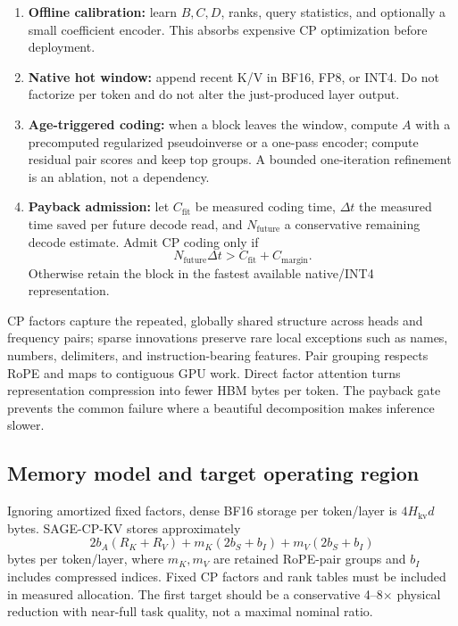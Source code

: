 \documentclass[10pt]{article}
\begin{document}
\begin{enumerate}[leftmargin=1.55em,itemsep=3pt]
\item \textbf{Offline calibration:} learn $B,C,D$, ranks, query statistics, and optionally a
small coefficient encoder. This absorbs expensive CP optimization before deployment.
\item \textbf{Native hot window:} append recent K/V in BF16, FP8, or INT4. Do not factorize per
token and do not alter the just-produced layer output.
\item \textbf{Age-triggered coding:} when a block leaves the window, compute $A$ with a
precomputed regularized pseudoinverse or a one-pass encoder; compute residual pair scores and keep
top groups. A bounded one-iteration refinement is an ablation, not a dependency.
\item \textbf{Payback admission:} let $C_{\mathrm{fit}}$ be measured coding time, $\Delta t$ the
measured time saved per future decode read, and $N_{\mathrm{future}}$ a conservative remaining
decode estimate. Admit CP coding only if
\[
N_{\mathrm{future}}\Delta t > C_{\mathrm{fit}}+C_{\mathrm{margin}}.
\]
Otherwise retain the block in the fastest available native/INT4 representation.
\end{enumerate}

\begin{keybox}[title={Intuitive advantage}]
CP factors capture the repeated, globally shared structure across heads and frequency pairs;
sparse innovations preserve rare local exceptions such as names, numbers, delimiters, and
instruction-bearing features. Pair grouping respects RoPE and maps to contiguous GPU work.
Direct factor attention turns representation compression into fewer HBM bytes per token. The
payback gate prevents the common failure where a beautiful decomposition makes inference slower.
\end{keybox}

\subsection{Memory model and target operating region}

Ignoring amortized fixed factors, dense BF16 storage per token/layer is
$4H_{\mathrm{kv}}d$ bytes. SAGE-CP-KV stores approximately
\[
 2b_A(R_K+R_V)+m_K(2b_S+b_I)+m_V(2b_S+b_I)
\]
bytes per token/layer, where $m_K,m_V$ are retained RoPE-pair groups and $b_I$ includes compressed
indices. Fixed CP factors and rank tables must be included in measured allocation. The first
target should be a conservative 4--8$\times$ physical reduction with near-full task quality,
not a maximal nominal ratio.
\end{document}
